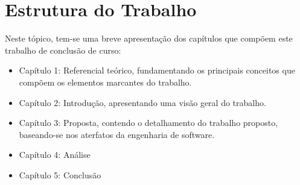 \section{Estrutura do Trabalho} %


Neste tópico, tem-se uma breve apresentação dos capítulos que compõem este trabalho de conclusão de curso:

\begin{itemize}
	\item Capítulo 1: Referencial teórico, fundamentando os principais conceitos que compõem os elementos marcantes do trabalho.
	\item Capítulo 2: Introdução, apresentando uma visão geral do trabalho.
	\item Capítulo 3: Proposta, contendo o detalhamento do trabalho proposto, baseando-se nos aterfatos da engenharia de software.
	\item Capítulo 4: Análise
	\item Capítulo 5: Conclusão
\end{itemize}

